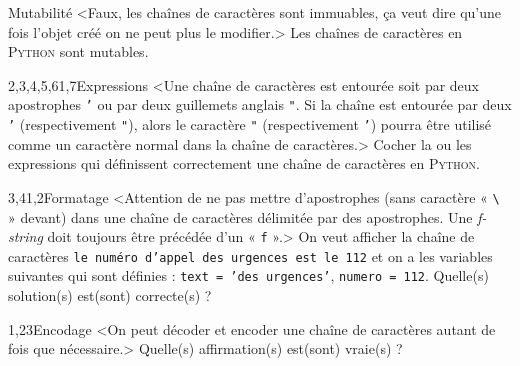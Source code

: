 \begin{quiz}[title={Chaînes de caractères}]
\begin{quizquestion*}[b]{2}{1}{Mutabilité}
<Faux, les chaînes de caractères sont immuables, ça veut dire qu'une fois l'objet créé on ne peut plus le modifier.> 
Les chaînes de caractères en \textsc{Python} sont mutables.
\end{quizquestion*}

\begin{quizquestion}[b]{2,3,4,5,6}{1,7}{Expressions}
<Une chaîne de caractères est entourée soit par deux apostrophes \texttt{'} ou par deux guillemets anglais \texttt{"}. Si la chaîne est entourée par deux \texttt{'} (respectivement \texttt{"}), alors le caractère \texttt{"} (respectivement \texttt{'}) pourra être utilisé comme un caractère normal dans la chaîne de caractères.> 
Cocher la ou les expressions qui définissent correctement une chaîne de caractères en \textsc{Python}.
\end{quizquestion}

\begin{quizquestion}[b]{3,4}{1,2}{Formatage}
<Attention de ne pas mettre d'apostro\-phes (sans caractère « \texttt{\textbackslash} » devant) dans une chaîne de caractères délimitée par des apostrophes. Une \textit{f-string} doit toujours être précédée d'un « \texttt{f} ».> 
On veut afficher la chaîne de caractères \texttt{le numéro d'appel des urgences est le 112} et on a les variables suivantes qui sont définies : \texttt{text = 'des urgences'}, \texttt{numero = 112}. Quelle(s) solution(s) est(sont) correcte(s) ?
\end{quizquestion}

\begin{quizquestion}[b]{1,2}{3}{Encodage}
<On peut décoder et encoder une chaîne de caractères autant de fois que nécessaire.> 
Quelle(s) affirmation(s) est(sont) vraie(s) ?
\end{quizquestion}
\end{quiz}

